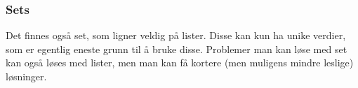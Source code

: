 




\begin{frame}
    \frametitle{Sets}

    Det finnes også set, som ligner veldig på lister. Disse kan kun ha unike verdier, som er egentlig eneste grunn til å bruke disse. Problemer man kan løse med set kan også løses med lister, men man kan få kortere (men muligens mindre leslige) løsninger. 

\end{frame}
